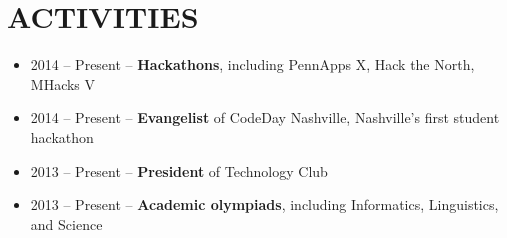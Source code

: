 \documentclass{res}
\begin{document}
\section{ACTIVITIES}

\begin{itemize} \itemsep -2pt
  \item 2014 -- Present -- \textbf{Hackathons}, including PennApps X, Hack the North, MHacks V
  \item 2014 -- Present -- \textbf{Evangelist} of CodeDay Nashville, Nashville's first student hackathon
  \item 2013 -- Present -- \textbf{President} of Technology Club
  \item 2013 -- Present -- \textbf{Academic olympiads}, including Informatics, Linguistics, and Science
\end{itemize}
\end{document}
